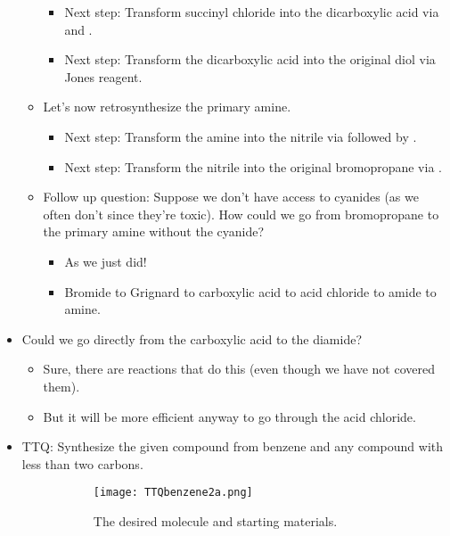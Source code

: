 \documentclass[../notes.tex]{subfiles}
\begin{document}
\begin{itemize}
\begin{itemize}
\begin{itemize}
            \item Next step: Transform succinyl chloride into the dicarboxylic acid via  and .
            \item Next step: Transform the dicarboxylic acid into the original diol via Jones reagent.
        \end{itemize}
        \item Let's now retrosynthesize the primary amine.
        \begin{itemize}
            \item Next step: Transform the amine into the nitrile via  followed by .
            \item Next step: Transform the nitrile into the original bromopropane via .
        \end{itemize}
        \item Follow up question: Suppose we don't have access to cyanides (as we often don't since they're toxic). How could we go from bromopropane to the primary amine without the cyanide?
        \begin{itemize}
            \item As we just did!
            \item Bromide to Grignard to carboxylic acid to acid chloride to amide to amine.
        \end{itemize}
    \end{itemize}
    \item Could we go directly from the carboxylic acid to the diamide?
    \begin{itemize}
        \item Sure, there are reactions that do this (even though we have not covered them).
        \item But it will be more efficient anyway to go through the acid chloride.
    \end{itemize}
    \item TTQ: Synthesize the given compound from benzene and any compound with less than two carbons.
    \begin{figure}[h!]
        \centering
        \begin{subfigure}[b]{\linewidth}
            \centering
            \texttt{[image: TTQbenzene2a.png]}
            \caption{The desired molecule and starting materials.}
            \label{fig:TTQbenzene2a}
        \end{subfigure}\\[2em]
        \begin{subfigure}[b]{\linewidth}

\end{subfigure}
\end{figure}
\end{itemize}
\end{document}

